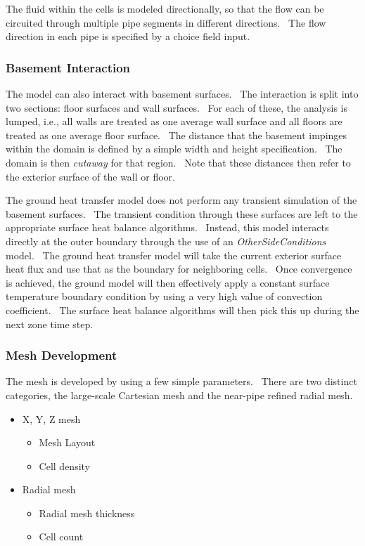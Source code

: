 The fluid within the cells is modeled directionally, so that the flow can be circuited through multiple pipe segments in different directions.~ The flow direction in each pipe is specified by a choice field input.

\subsubsection{Basement Interaction}\label{basement-interaction}

The model can also interact with basement surfaces.~ The interaction is split into two sections: floor surfaces and wall surfaces.~ For each of these, the analysis is lumped, i.e., all walls are treated as one average wall surface and all floors are treated as one average floor surface.~ The distance that the basement impinges within the domain is defined by a simple width and height specification.~ The domain is then \emph{cutaway} for that region.~ Note that these distances then refer to the exterior surface of the wall or floor.

The ground heat transfer model does not perform any transient simulation of the basement surfaces.~ The transient condition through these surfaces are left to the appropriate surface heat balance algorithms.~ Instead, this model interacts directly at the outer boundary through the use of an \emph{OtherSideConditions} model.~ The ground heat transfer model will take the current exterior surface heat flux and use that as the boundary for neighboring cells.~ Once convergence is achieved, the ground model will then effectively apply a constant surface temperature boundary condition by using a very high value of convection coefficient.~ The surface heat balance algorithms will then pick this up during the next zone time step.

\subsubsection{Mesh Development}\label{mesh-development}

The mesh is developed by using a few simple parameters.~ There are two distinct categories, the large-scale Cartesian mesh and the near-pipe refined radial mesh.

\begin{itemize}
\item
  X, Y, Z mesh
\begin{itemize}
\item
  Mesh Layout
\item
  Cell density
\end{itemize}
\item
  Radial mesh
\begin{itemize}
\item
  Radial mesh thickness
\item
  Cell count
\end{itemize}
\end{itemize}

